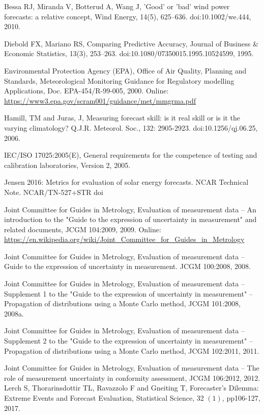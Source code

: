 \begin{thebibliography}{27}
Bessa RJ, Miranda V, Botterud A, Wang J, 'Good’ or ’bad’ wind power forecasts: a relative concept, Wind Energy, 14(5), 625–636. doi:10.1002/we.444, 2010.

Diebold FX, Mariano RS, Comparing Predictive Accuracy, Journal of Business \& Economic Statistics, 13(3), 253–263. doi:10.1080/07350015.1995.10524599, 1995.

Environmental Protection Agency (EPA), Office of Air Quality, Planning and Standards, Meteorological Monitoring Guidance for Regulatory modelling Applications, Doc. EPA-454/R-99-005, 2000. 
Online: \url{https://www3.epa.gov/scram001/guidance/met/mmgrma.pdf}

Hamill, TM and Juras, J, Measuring forecast skill: is it real skill or is it the varying climatology? Q.J.R. Meteorol. Soc., 132: 2905-2923. doi:10.1256/qj.06.25, 2006.

IEC/ISO 17025:2005(E), General requirements for the competence of testing and calibration laboratories, Version 2, 2005.

Jensen 2016: Metrics for evaluation of solar energy forecasts. NCAR Technical Note. NCAR/TN-527+STR doi

Joint Committee for Guides in Metrology, Evaluation of measurement data -- An introduction to the "Guide to the expression of uncertainty in measurement" and related documents, JCGM 104:2009, 2009. Online: \url{https://en.wikipedia.org/wiki/Joint_Committee_for_Guides_in_Metrology}

Joint Committee for Guides in Metrology, Evaluation of measurement data -- Guide to the expression of uncertainty in measurement. JCGM 100:2008, 2008.

Joint Committee for Guides in Metrology, Evaluation of measurement data -- Supplement 1 to the "Guide to the expression of uncertainty in measurement" -- Propagation of distributions using a Monte Carlo method, JCGM 101:2008, 2008a.

Joint Committee for Guides in Metrology, Evaluation of measurement data -- Supplement 2 to the "Guide to the expression of uncertainty in measurement" -- Propagation of distributions using a Monte Carlo method, JCGM 102:2011, 2011.

Joint Committee for Guides in Metrology, Evaluation of measurement data -- The role of measurement uncertainty in conformity assessment, JCGM 106:2012, 2012.
Lerch S, Thorarinsdottir TL, Ravazzolo F and Gneiting T, Forecaster’s Dilemma: Extreme Events and Forecast Evaluation, Statistical Science, 32 $(1)$, pp106-127, 2017.


\end{thebibliography}

